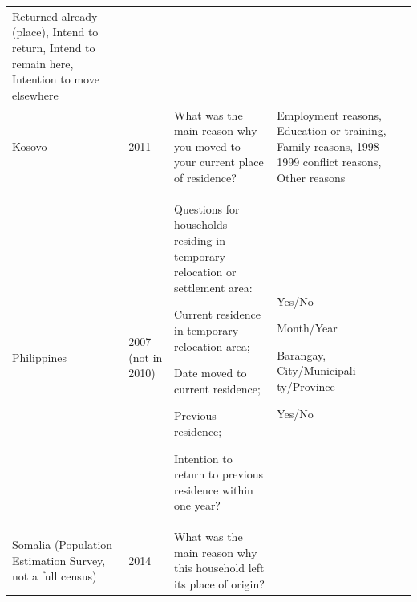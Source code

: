 \documentclass[
]{article}
\begin{document}
\begin{longtable}[]{@{}llll@{}}
\begin{minipage}[t]{0.22\columnwidth}
Returned
already
(place), Intend
to return,
Intend to
remain here,
Intention to
move elsewhere\strut
\end{minipage}\tabularnewline
\begin{minipage}[t]{0.22\columnwidth}\raggedright
Kosovo\strut
\end{minipage} & \begin{minipage}[t]{0.22\columnwidth}\raggedright
2011\strut
\end{minipage} & \begin{minipage}[t]{0.22\columnwidth}\raggedright
What was the
main reason why
you moved to
your current
place of
residence?\strut
\end{minipage} & \begin{minipage}[t]{0.22\columnwidth}\raggedright
Employment
reasons,
Education or
training,
Family reasons,
1998-1999
conflict
reasons, Other
reasons\strut
\end{minipage}\tabularnewline
\begin{minipage}[t]{0.22\columnwidth}\raggedright
Philippines\strut
\end{minipage} & \begin{minipage}[t]{0.22\columnwidth}\raggedright
2007 (not in
2010)\strut
\end{minipage} & \begin{minipage}[t]{0.22\columnwidth}\raggedright
Questions for
households
residing in
temporary
relocation or
settlement
area:

Current
residence in
temporary
relocation
area;

Date moved to
current
residence;

Previous
residence;

Intention to
return to
previous
residence
within one
year?\strut
\end{minipage} & \begin{minipage}[t]{0.22\columnwidth}\raggedright
Yes/No

Month/Year

Barangay,
City/Municipali
ty/Province

Yes/No\strut
\end{minipage}\tabularnewline
\begin{minipage}[t]{0.22\columnwidth}\raggedright
Somalia
(Population
Estimation
Survey, not a
full census)\strut
\end{minipage} & \begin{minipage}[t]{0.22\columnwidth}\raggedright
2014\strut
\end{minipage} & \begin{minipage}[t]{0.22\columnwidth}\raggedright
What was the
main reason why
this household
left its place
of origin?


\end{minipage}
\end{longtable}
\end{document}
